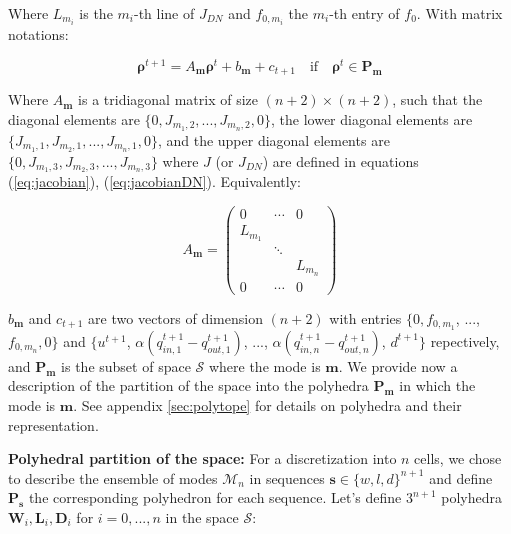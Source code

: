 \documentclass[11pt]{article}
\numberwithin{equation}{section}
\numberwithin{figure}{section}
\numberwithin{table}{section}
\begin{document}
\noindent Where $L_{m_{i}}$ is the $m_{i}$-th line of $J_{DN}$ and $f_{0,m_{i}}$ the $m_{i}$-th entry of $f_{0}$. With matrix notations:

\begin{equation}
\boldsymbol\rho^{t+1} = A_{\boldsymbol m} \boldsymbol\rho^{t} + b_{\boldsymbol m} + c_{t+1} \quad\text{if}\quad\boldsymbol\rho^{t}\in\textbf{P}_{\boldsymbol m}
\label{eq:underlyingSystemDN2}
\end{equation}

\noindent Where $A_{\boldsymbol m}$ is a tridiagonal matrix of size $(n+2)\times(n+2)$, such that the diagonal elements are $\{0, J_{m_{1},2},...,J_{m_{n},2},0\}$, the lower diagonal elements are $\{J_{m_{1},1},J_{m_{2},1},...,J_{m_{n},1},0\}$, and the upper diagonal elements are $\{0,J_{m_{1},3},J_{m_{2},3},...,J_{m_{n},3}\}$ where $J$ (or $J_{DN}$) are defined in equations (\ref{eq:jacobian}), (\ref{eq:jacobianDN}). Equivalently:

\begin{equation}\label{eq:matrixA}
 A_{\boldsymbol m} =
 \begin{pmatrix}
0 & \cdots & 0 \\
L_{m_{1}} & & \\
& \ddots & \\
& & L_{m_{n}}\\
0 & \cdots & 0
\end{pmatrix}
\end{equation}

\noindent $b_{\boldsymbol m}$ and $c_{t+1}$ are two vectors of dimension $(n+2)$ with entries $\{0, f_{0,m_{1}}$, ..., $f_{0,m_{n}}, 0\}$ and $\{u^{t+1}$, $\alpha (q^{t+1}_{in,1}-q^{t+1}_{out,1})$, ..., $\alpha(q^{t+1}_{in,n}-q^{t+1}_{out,n})$, $d^{t+1}\}$ repectively, and $\textbf{P}_{\boldsymbol m}$ is the subset of space $\mathcal{S}$ where the mode is $\boldsymbol m$. We provide now a description of the partition of the space into the polyhedra $\textbf{P}_{\boldsymbol m}$ in which the mode is $\boldsymbol m$. See appendix \ref{sec:polytope} for details on polyhedra and their representation.

\hspace{10mm}

\noindent\textbf{Polyhedral partition of the space:} For a discretization into $n$ cells, we chose to describe the ensemble of modes $\mathcal{M}_{n}$ in sequences $\boldsymbol s \in \{w,l,d\}^{n+1}$ and define $\textbf{P}_{\boldsymbol s}$ the corresponding polyhedron for each sequence. Let's define $3^{n+1}$ polyhedra $\textbf{W}_{i}, \textbf{L}_{i}, \textbf{D}_{i}$ for $i=0,...,n$ in the space $\mathcal{S}$:
\end{document}
